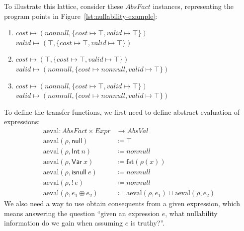 \documentclass[runningheads]{llncs}
\newcommand{\lub}{\sqcup}
\newcommand{\Expr}{\mathit{Expr}}
\newcommand{\AbsVal}{\mathit{AbsVal}}
\newcommand{\AbsFact}{\mathit{AbsFact}}
\newcommand{\nonnull}{\mathit{nonnull}}
\newcommand{\knull}{\mathsf{null}}
\newcommand{\kInt}{\mathsf{Int}}
\newcommand{\kVar}{\mathsf{Var}}
\newcommand{\kisnull}{\mathsf{isnull}}
\newcommand{\aeval}{\mathrm{aeval}}
\newcommand{\fst}{\mathrm{fst}}
\begin{document}
To illustrate this lattice, consider these $\AbsFact$ instances, representing the program points in Figure~\ref{lst:nullability-example}:
\begin{enumerate}
  \item $\mathit{cost} \mapsto (\nonnull, \{\mathit{cost} \mapsto \top, \mathit{valid} \mapsto \top\})$\\
        $\mathit{valid} \mapsto (\top, \{\mathit{cost} \mapsto \top, \mathit{valid} \mapsto \top\})$
  \item $\mathit{cost} \mapsto (\top, \{\mathit{cost} \mapsto \top, \mathit{valid} \mapsto \top\})$\\
        $\mathit{valid} \mapsto (\nonnull, \{\mathit{cost} \mapsto \nonnull, \mathit{valid} \mapsto \top\})$
  \item $\mathit{cost} \mapsto (\nonnull, \{\mathit{cost} \mapsto \top, \mathit{valid} \mapsto \top\})$\\
        $\mathit{valid} \mapsto (\nonnull, \{\mathit{cost} \mapsto \nonnull, \mathit{valid} \mapsto \top\})$
\end{enumerate}
To define the transfer functions, we first need to define abstract evaluation of expressions:
\begin{align*}
  \aeval : \AbsFact \times \Expr & \to \AbsVal \\
  \aeval(\rho, \knull)        & \coloneqq \top \\
  \aeval(\rho, \kInt\ n)      & \coloneqq \nonnull \\
  \aeval(\rho, \kVar\ x)      & \coloneqq \fst(\rho(x)) \\
  \aeval(\rho, \kisnull\ e)   & \coloneqq \nonnull \\
  \aeval(\rho, {!}\,e)        & \coloneqq \nonnull \\
  \aeval(\rho, e_1 \oplus e_2) & \coloneqq \aeval(\rho, e_1) \lub \aeval(\rho, e_2)
\end{align*}
We also need a way to use obtain consequents from a given expression, which means answering the question ``given an expression $e$, what nullability information do we gain when assuming $e$ is truthy?''.
\end{document}
